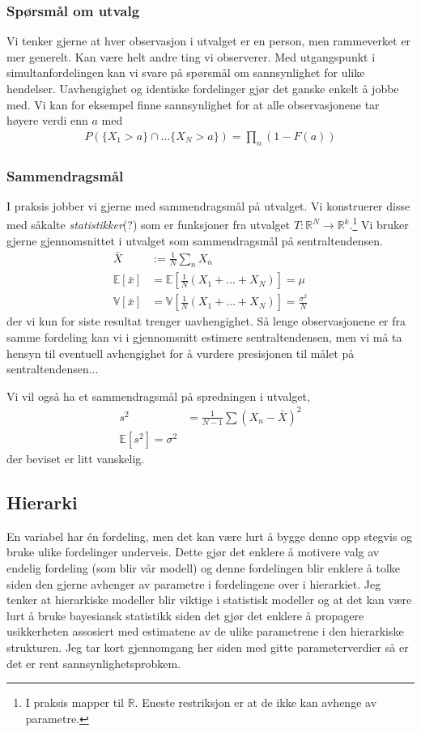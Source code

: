 \subsubsection{Spørsmål om utvalg}
Vi tenker gjerne at hver observasjon i utvalget er en person, men rammeverket er mer generelt. Kan være helt andre ting vi observerer. Med utgangspunkt i simultanfordelingen kan vi svare på spørsmål om sannsynlighet for ulike hendelser. Uavhengighet og identiske fordelinger gjør det ganske enkelt å jobbe med. Vi kan for eksempel finne sannsynlighet for at alle observasjonene tar høyere verdi enn $a$ med
\begin{align}
P(\{X_1 > a\}\cap \dots \{X_N > a\}) = \prod_n (1-F(a))
\end{align}
\subsubsection{Sammendragsmål}
I praksis jobber vi gjerne med sammendragsmål på utvalget. Vi konstruerer disse med såkalte \textit{statistikker}(?) som er funksjoner fra utvalget $T:\mathbb{R}^N\to\mathbb{R}^k$.\footnote{I praksis mapper til $\mathbb{R}$. Eneste restriksjon er at de ikke kan avhenge av parametre.} Vi bruker gjerne gjennomsnittet i utvalget som sammendragsmål på sentraltendensen. 
\begin{align}
\bar{X} &:= \frac{1}{N}\sum_n X_n \\
\mathbb{E}[\bar{x}] &= \mathbb{E}[\frac{1}{N}(X_1 +\dots + X_N)] = \mu \\
\mathbb{V}[\bar{x}] &= \mathbb{V}[\frac{1}{N}(X_1 +\dots + X_N)] = \frac{\sigma^2}{N}
\end{align}
der vi kun for siste resultat trenger uavhengighet. Så lenge observasjonene er fra samme fordeling kan vi i gjennomsnitt estimere sentraltendensen, men vi må ta hensyn til eventuell avhengighet for å vurdere presisjonen til målet på sentraltendensen...

Vi vil også ha et sammendragsmål på spredningen i utvalget,
\begin{align}
s^2 &= \frac{1}{N-1}\sum(X_n-\bar{X})^2\\
\mathbb{E}[s^2] = \sigma^2
\end{align}
der beviset er litt vanskelig.
\subsection{Hierarki}
En variabel har én fordeling, men det kan være lurt å bygge denne opp stegvis og bruke ulike fordelinger underveis. Dette gjør det enklere å motivere valg av endelig fordeling (som blir vår modell) og denne fordelingen blir enklere å tolke siden den gjerne avhenger av parametre i fordelingene over i hierarkiet. Jeg tenker at hierarkiske modeller blir viktige i statistisk modeller og at det kan være lurt å bruke bayesiansk statistikk siden det gjør det enklere å propagere usikkerheten assosiert med estimatene av de ulike parametrene i den hierarkiske strukturen. Jeg tar kort gjennomgang her siden med gitte parameterverdier så er det er rent sannsynlighetsprobkem.

